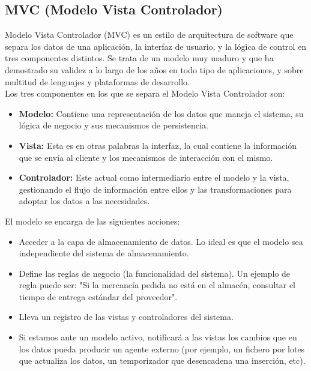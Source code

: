 		\subsection{MVC (Modelo Vista Controlador)}

			Modelo Vista Controlador (MVC) es un estilo de arquitectura de software que separa los datos de una aplicaci\'on, la interfaz de usuario, y la l\'ogica de control en tres componentes distintos. Se trata de un modelo muy maduro y que ha demostrado su validez a lo largo de los a\~nos en todo tipo de aplicaciones, y sobre multitud de lenguajes y plataformas de desarrollo. \\

			Los tres componentes en los que se separa el Modelo Vista Controlador son:
			\begin{itemize}
				\item \textbf{Modelo:} Contiene una representaci\'on de los datos que maneja el sistema, su l\'ogica de negocio y sus mecanismos de persistencia.
				\item \textbf{Vista:} Esta es en otras palabras la interfaz, la cual contiene la informaci\'on que se env\'ia al cliente y los mecanismos de interacci\'on con el mismo.
				\item \textbf{Controlador:} Este actual como intermediario entre el modelo y la vista, gestionando el flujo de informaci\'on entre ellos y las transformaciones para adoptar los datos a las necesidades.
			\end{itemize}

			El modelo se encarga de las siguientes acciones:
			\begin{itemize}
				\item Acceder a la capa de almacenamiento de datos. Lo ideal es que el modelo sea independiente del sistema de almacenamiento.
				\item Define las reglas de negocio (la funcionalidad del sistema). Un ejemplo de regla puede ser: "Si la mercanc\'ia pedida no est\'a en el almac\'en, consultar el tiempo de entrega est\'andar del proveedor".
				\item Lleva un registro de las vistas y controladores del sistema. 
				\item Si estamos ante un modelo activo, notificar\'a a las vistas los cambios que en los datos pueda producir un agente externo (por ejemplo, un fichero por lotes que actualiza los datos, un temporizador que desencadena una inserci\'on, etc).
			\end{itemize}

